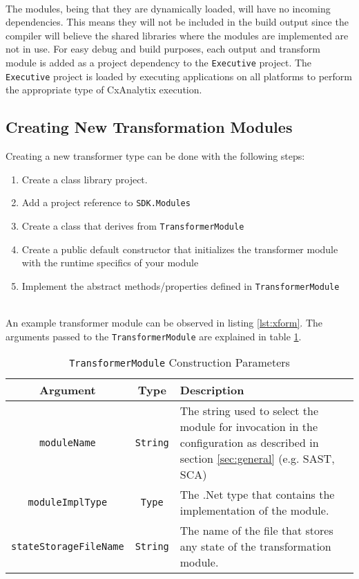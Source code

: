 \noindent\\The modules, being that they are dynamically loaded, will have no incoming dependencies.  This means they will not be included
in the build output since the compiler will believe the shared libraries where the modules are implemented are not in use.  For easy debug and build
purposes, each output and transform module is added as a project dependency to the \texttt{Executive} project.  The \texttt{Executive} project
is loaded by executing applications on all platforms to perform the appropriate type of CxAnalytix execution.


\subsection{Creating New Transformation Modules}

Creating a new transformer type can be done with the following steps:

\begin{enumerate}
    \item Create a class library project.
    \item Add a project reference to \texttt{SDK.Modules}
    \item Create a class that derives from \texttt{TransformerModule}
    \item Create a public default constructor that initializes the transformer module with the runtime specifics of your module
    \item Implement the abstract methods/properties defined in \texttt{TransformerModule}
\end{enumerate}

\noindent\\An example transformer module can be observed in listing \ref{lst:xform}. The arguments passed to the \texttt{TransformerModule}
are explained in table \ref{tab:xform}.


\begin{table}
    \centering
    \begin{tabular}{|c|c|l|}
        \toprule
        \textbf{Argument} & \textbf{Type} & \textbf{Description}\\
        \midrule
        \texttt{moduleName} & \texttt{String} & \makecell[l]{The string used to select the module for invocation in the\\
        configuration as described in section \ref{sec:general} (e.g. SAST, SCA)}\\
        \midrule
        \texttt{moduleImplType} & \texttt{Type} & The .Net type that contains the implementation of the module.\\
        \midrule
        \texttt{stateStorageFileName} & \texttt{String} & The name of the file that stores any state of the transformation module.\\
        \bottomrule
    \end{tabular}
    \caption{\texttt{TransformerModule} Construction Parameters}
    \label{tab:xform}
\end{table}



